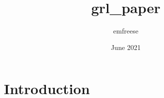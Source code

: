 \documentclass{article}
\title{grl_paper}
\author{emfreese }
\date{June 2021}
\begin{document}
\maketitle

\section{Introduction}
\end{document}
